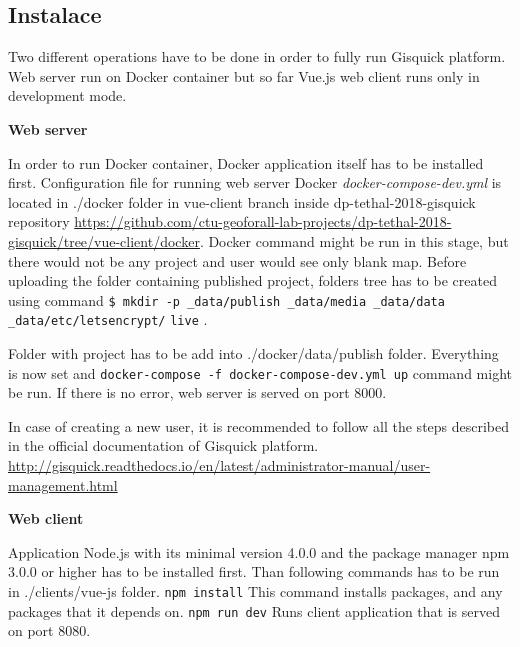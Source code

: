 \subsection{Instalace}
\label{sssec:manual-instalace}

Two different operations have to be done in order to fully run Gisquick
platform. Web server run on Docker container but so far Vue.js web client
runs only in development mode.

\bigskip
\noindent
\textbf{Web server}

\noindent
In order to run Docker container, Docker application itself has to be
installed first.  Configuration file for running web server
Docker \textit{docker-compose-dev.yml} is located in ./docker folder in
vue-client branch inside dp-tethal-2018-gisquick
repository \newline \url{https://github.com/ctu-geoforall-lab-projects/dp-tethal-2018-gisquick/tree/vue-client/docker}. Docker
command might be run in this stage, but there would not be any project
and user would see only blank map. Before uploading the folder
containing published project, folders tree has to be created using
command
\newline \verb|$ mkdir -p _data/publish _data/media _data/data _data/etc/letsencrypt/| \newline \verb|live| \cite{gisquick-manual}. 

\noindent
Folder with project has to be add into ./docker/\textunderscore data/publish folder.
Everything is now set and 
\newline \verb|docker-compose -f docker-compose-dev.yml up| \newline
command might be run. If there is no error, web server is served on port 8000.

\noindent
In case of creating a new user, it is recommended to follow all the
steps described in the official documentation of Gisquick
platform. \url{http://gisquick.readthedocs.io/en/latest/administrator-manual/user-management.html}

\bigskip
\noindent
\textbf{Web client}

\noindent
Application Node.js with its minimal version 4.0.0 and the package manager npm 3.0.0 
or higher has to be installed first. Than following commands has to be run in 
./clients/vue-js folder.
\newline \verb|npm install| \newline
This command installs packages, and any packages that it depends on.
\newline \verb|npm run dev| \newline
Runs client application that is served on port 8080.


